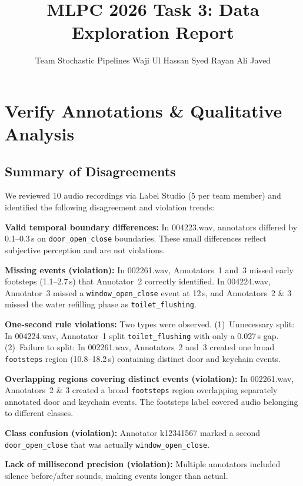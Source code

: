 \documentclass{article}
\title{MLPC 2026 Task 3: Data Exploration Report}
\author{%
  Team Stochastic Pipelines \AND
  Waji Ul Hassan Syed
  \And
  Rayan Ali Javed
}
\begin{document}
\maketitle


\section{Verify Annotations \& Qualitative Analysis}

\subsection{Summary of Disagreements}

We reviewed 10 audio recordings via Label Studio (5 per team member) and identified the following disagreement and violation trends:

\textbf{Valid temporal boundary differences:} In 004223.wav, annotators differed by 0.1--0.3\,s on \texttt{door\_open\_close} boundaries. These small differences reflect subjective perception and are not violations.

\textbf{Missing events (violation):} In 002261.wav, Annotators~1 and~3 missed early footsteps (1.1--2.7\,s) that Annotator~2 correctly identified. In 004224.wav, Annotator~3 missed a \texttt{window\_open\_close} event at 12\,s, and Annotators~2 \& 3 missed the water refilling phase as \texttt{toilet\_flushing}.

\textbf{One-second rule violations:} Two types were observed. (1)~Unnecessary split: In 004224.wav, Annotator~1 split \texttt{toilet\_flushing} with only a 0.027\,s gap. (2)~Failure to split: In 002261.wav, Annotators~2 and~3 created one broad \texttt{footsteps} region (10.8--18.2\,s) containing distinct door and keychain events.

\textbf{Overlapping regions covering distinct events (violation):} In 002261.wav, Annotators~2 \& 3 created a broad \texttt{footsteps} region overlapping separately annotated door and keychain events. The footsteps label covered audio belonging to different classes.

\textbf{Class confusion (violation):} Annotator k12341567 marked a second \texttt{door\_open\_close} that was actually \texttt{window\_open\_close}.

\textbf{Lack of millisecond precision (violation):} Multiple annotators included silence before/after sounds, making events longer than actual.
\end{document}
